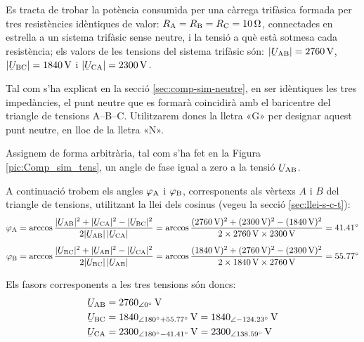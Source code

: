\begin{exemple}\label{ex:comp-sim}
    Es tracta de trobar la potència consumida per una càrrega trifàsica
    formada per tres resistències idèntiques de valor: $R_\mathrm{A}=R_\mathrm{B}=R_\mathrm{C}=\SI{10}{\ohm}$,
    connectades en estrella a un sistema trifàsic sense neutre, i la
    tensió a què està sotmesa cada resistència; els valors de les
    tensions del sistema trifàsic són: $|\cmplx{U}\ped{AB}| =
    \SI{2760}{V}$, $|\cmplx{U}\ped{BC}| = \SI{1840}{V}$ i
    $|\cmplx{U}\ped{CA}| = \SI{2300}{V}$.

    Tal com s'ha explicat en la secció \vref{sec:comp-sim-neutre}, en ser idèntiques les tres impedàncies, el punt neutre que es formarà coincidirà amb el baricentre del triangle de tensions A--B--C. Utilitzarem doncs la lletra «G» per designar aquest punt neutre, en lloc de la lletra «N».

    Assignem de forma arbitrària, tal com s'ha fet en la Figura
    \vref{pic:Comp_sim_tens}, un angle de fase igual a zero a la tensió
    $\cmplx{U}\ped{AB}$.

    \begin{center}
        
    \end{center}

    A continuació trobem els angles $\varphi_\mathrm{A}$ i $\varphi_\mathrm{B}$,
    corresponents als vèrtexs  $A$ i $B$ del triangle de
    tensions, utilitzant la llei dels cosinus (vegeu la secció
    \vref{sec:llei-s-c-t}): 
    \begin{align*}
        \varphi\ped{A} &= \arccos \frac{|\cmplx{U}\ped{AB}|^2 + |\cmplx{U}\ped{CA}|^2 -
        |\cmplx{U}\ped{BC}|^2}{2 |\cmplx{U}\ped{AB}| \,|\cmplx{U}\ped{CA}|} =
        \arccos \frac{(\SI{2760}{V})^2 + (\SI{2300}{V})^2 - (\SI{1840}{V})^2}{2 \times \SI{2760}{V}
        \times \SI{2300}{V}} = \ang{41,41} \\[1ex]
        \varphi\ped{B} &= \arccos \frac{|\cmplx{U}\ped{BC}|^2 + |\cmplx{U}\ped{AB}|^2 -
        |\cmplx{U}\ped{CA}|^2}{2 |\cmplx{U}\ped{BC}| \,|\cmplx{U}\ped{AB}|} =
        \arccos \frac{(\SI{1840}{V})^2 + (\SI{2760}{V})^2 - (\SI{2300}{V})^2}{2 \times \SI{1840}{V}
        \times \SI{2760}{V}} = \ang{55,77}
    \end{align*}

    Els fasors corresponents a les tres tensions són doncs:
    \begin{align*}
    \cmplx{U}\ped{AB} &= \SIpd{2760}{0}{V} \\
    \cmplx{U}\ped{BC} &= \num{1840}_{\angle\ang{180} + \ang{55,77}}\si{\,V} =
    \SIpd{1840}{-124,23}{V} \\
    \cmplx{U}\ped{CA} &= \num{2300}_{\angle\ang{180} - \ang{41,41}}\si{\,V} = \SIpd{2300}{138,59}{V}
    \end{align*}


\end{exemple}

